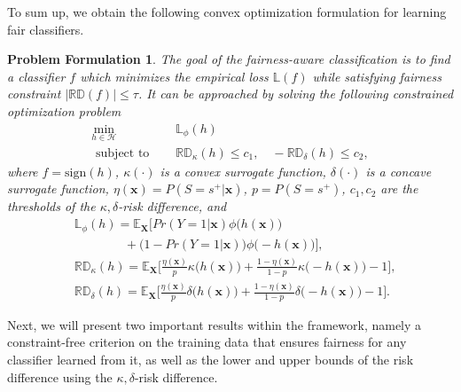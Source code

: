 \documentclass[letterpaper]{article} %
\newcommand{\X}{\mathbf{X}}
\newcommand{\x}{\mathbf{x}}
\newcommand{\E}{\mathbb{E}}
\newcommand{\sign}{\textrm{sign}}
\newcommand{\Loss}{\mathbb{L}}
\newcommand{\RD}{\mathbb{RD}}
\newtheorem{formulation}{Problem Formulation}
\begin{document}
To sum up, we obtain the following convex optimization formulation for learning fair classifiers.

\begin{formulation}\label{for:fc1}
	The goal of the fairness-aware classification is to find a classifier $f$ which minimizes the empirical loss $\Loss(f)$ while satisfying fairness constraint $|\RD(f)|\leq \tau$. It can be approached by solving the following constrained optimization problem
	\begin{align}
		\label{opt:surrogated_fair_classification} \min_{ h \in \mathcal{H}} \quad & \Loss_{\phi} (h)      \nonumber                                  \\
		\nonumber                                   \text{ subject to } \quad      & \RD_{ \kappa } (h) \leq c_1, \quad -\RD_{ \delta } (h) \leq c_2,
	\end{align}
	where $f = \sign(h)$, $\kappa(\cdot)$ is a convex surrogate function, $\delta(\cdot)$ is a concave surrogate function, $\eta(\x) = P(S=s^+|\x)$, $p = P(S=s^+)$, $c_1, c_2$ are the thresholds of the $\kappa,\delta$-risk difference, and
	\begin{align*}
		 & \Loss_{\phi} (h) = \E_{\X} \big[ Pr(Y=1|\x) \phi \big(h(\x) \big)                                                                           \\
		 & \qquad\qquad + \big(1 - Pr(Y=1|\x) \big) \phi \big( - h(\x) \big) \big],                                                                          \\
		 & \RD_{ \kappa } (h) = \E_{\X} \big[ \frac{\eta(\x)}{p} \kappa \big( h(\x) \big) + \frac{1-\eta(\x)}{1-p} \kappa \big( -h(\x) \big) -1 \big], \\
		 & \RD_{ \delta } (h) = \E_{\X} \big[ \frac{\eta(\x)}{p} \delta \big( h(\x) \big) + \frac{1-\eta(\x)}{1-p} \delta \big( -h(\x) \big) -1 \big].
	\end{align*}
\end{formulation}

Next, we will present two important results within the framework, namely a constraint-free criterion on the training data that ensures fairness for any classifier learned from it, as well as the lower and upper bounds of the risk difference using the $\kappa,\delta$-risk difference.

\end{document}
